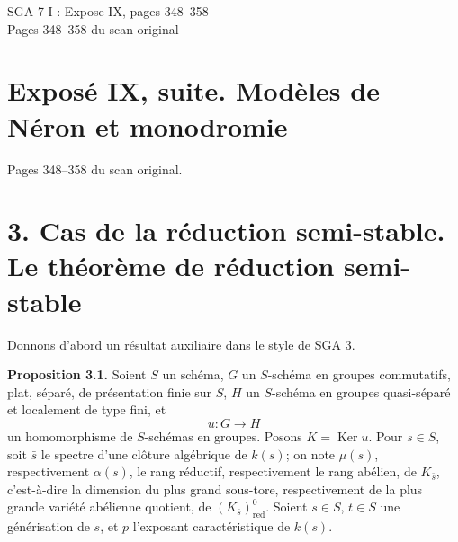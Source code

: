 \documentclass[11pt]{article}
\providecommand{\Ker}{\operatorname{Ker}}
\begin{document}
\begin{center}
{\Large SGA 7-I : Expose IX, pages 348--358}\\[0.35em]
{\large Pages 348--358 du scan original}
\end{center}

\section*{Exposé IX, suite. Modèles de Néron et monodromie}
\begin{center}
Pages 348--358 du scan original.
\end{center}

\section*{3. Cas de la réduction semi-stable. Le théorème de réduction semi-stable}

Donnons d'abord un résultat auxiliaire dans le style de SGA 3.

\textbf{Proposition 3.1.} Soient \(S\) un schéma, \(G\) un \(S\)-schéma en groupes commutatifs, plat, séparé, de présentation finie sur \(S\), \(H\) un \(S\)-schéma en groupes quasi-séparé et localement de type fini, et
\[
        u:G\longrightarrow H
\]
un homomorphisme de \(S\)-schémas en groupes.  Posons \(K=\Ker u\).  Pour \(s\in S\), soit \(\bar s\) le spectre d'une clôture algébrique de \(k(s)\); on note \(\mu(s)\), respectivement \(\alpha(s)\), le rang réductif, respectivement le rang abélien, de \(K_{\bar s}\), c'est-à-dire la dimension du plus grand sous-tore, respectivement de la plus grande variété abélienne quotient, de \((K_{\bar s})^0_{\mathrm{red}}\).  Soient \(s\in S\), \(t\in S\) une générisation de \(s\), et \(p\) l'exposant caractéristique de \(k(s)\).
\end{document}
